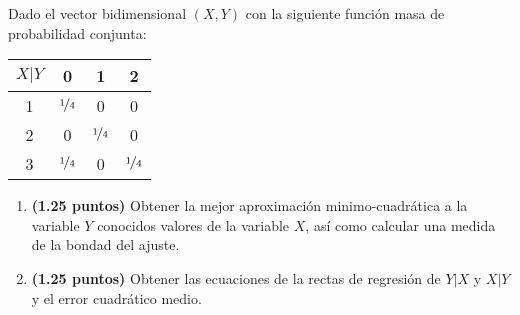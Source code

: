 \documentclass[12pt]{article}
\begin{document}
    \begin{ejercicio}
        Dado el vector bidimensional $(X,Y)$ con la siguiente función masa de probabilidad conjunta:
        \begin{table}[H]
        \centering
        \begin{tabular}{|c|ccc|}
            \hline
            $X|Y$ & 0 & 1 & 2 \\
            \hline
            1 & $\nicefrac{1}{4}$ & 0 & 0 \\
            2 & 0 & $\nicefrac{1}{4}$ & 0 \\
            3 & $\nicefrac{1}{4}$ & 0 & $\nicefrac{1}{4}$ \\
            \hline
        \end{tabular}
        \end{table}
        \begin{enumerate}
            \item \textbf{(1.25 puntos)} Obtener la mejor aproximación minimo-cuadrática a la variable $Y$ conocidos valores de la variable $X$, así como calcular una medida de la bondad del ajuste.
            \item \textbf{(1.25 puntos)} Obtener las ecuaciones de la rectas de regresión de $Y|X$ y $X|Y$ y el error cuadrático medio.
        \end{enumerate}
    \end{ejercicio}
\end{document}

